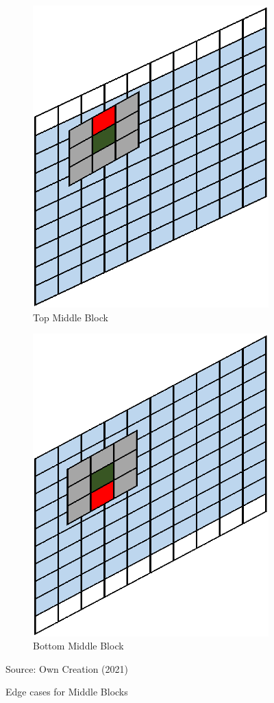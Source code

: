 \begin{figure}[H]
\centering
\begin{subfigure}{.5\textwidth}
  \centering
  \includegraphics[width=.5\linewidth]{Figures/Chapter3/topmid}
  \caption{Top Middle Block}
\end{subfigure}%
\begin{subfigure}{.5\textwidth}
  \centering
  \includegraphics[width=.5\linewidth]{Figures/Chapter3/botmid}
  \caption{Bottom Middle Block}
\end{subfigure}
\caption{Edge cases for Middle Blocks}
\begin{center}
Source: Own Creation (2021)
\end{center}
\end{figure}


